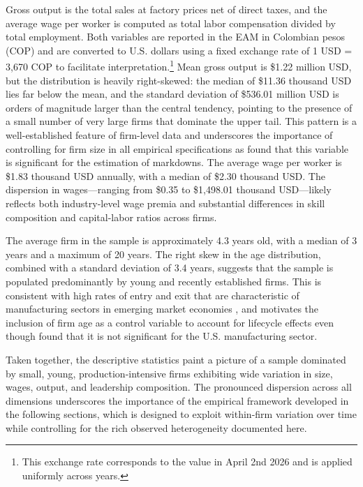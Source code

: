 \documentclass[12pt]{article}
\begin{document}
Gross output is the total sales at factory prices net of direct taxes, and the average wage per worker is computed as total labor compensation divided by total employment. Both variables are reported in the EAM in Colombian pesos (COP) and are converted to U.S. dollars using a fixed exchange rate of 1 USD = 3,670 COP to facilitate interpretation.\footnote{This exchange rate corresponds to the value in April 2nd 2026 and is applied uniformly across years.} Mean gross output is \$1.22 million USD, but the distribution is heavily right-skewed: the median of \$11.36 thousand USD lies far below the mean, and the standard deviation of \$536.01 million USD is orders of magnitude larger than the central tendency, pointing to the presence of a small number of very large firms that dominate the upper tail. This pattern is a well-established feature of firm-level data and underscores the importance of controlling for firm size in all empirical specifications as \textcite{yeh_monopsony_2022} found that this variable is significant for the estimation of markdowns. The average wage per worker is \$1.83 thousand USD annually, with a median of \$2.30 thousand USD. The dispersion in wages—ranging from \$0.35 to \$1,498.01 thousand USD—likely reflects both industry-level wage premia and substantial differences in skill composition and capital-labor ratios across firms.

The average firm in the sample is approximately 4.3 years old, with a median of 3 years and a maximum of 20 years. The right skew in the age distribution, combined with a standard deviation of 3.4 years, suggests that the sample is populated predominantly by young and recently established firms. This is consistent with high rates of entry and exit that are characteristic of manufacturing sectors in emerging market economies \parencite{alviarez_markets_2025}, and motivates the inclusion of firm age as a control variable to account for lifecycle effects even though \textcite{yeh_monopsony_2022} found that it is not significant for the U.S. manufacturing sector.

Taken together, the descriptive statistics paint a picture of a sample dominated by small, young, production-intensive firms exhibiting wide variation in size, wages, output, and leadership composition. The pronounced dispersion across all dimensions underscores the importance of the empirical framework developed in the following sections, which is designed to exploit within-firm variation over time while controlling for the rich observed heterogeneity documented here.
\end{document}
